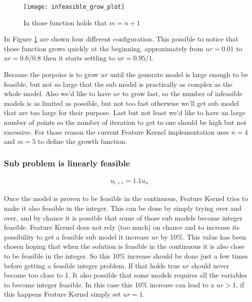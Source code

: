    \begin{figure}[H]
        \centering
        \texttt{[image: infeasible\_grow\_plot]}
        \caption{In those function holds that $m = n+1$}\label{fig:inf-grow-plot}
    \end{figure}
    
    In Figure \ref{fig:inf-grow-plot} are shown four different configuration. This possible to notice that those function
    grows quickly at the beginning, approximately from $ur = 0.01$ to $ur = 0.6 / 0.8$ then it starts settling
    to $ur = 0.95 / 1$.

    Because the porpoise is to grow $ur$ until the generate model is large enough to be feasible, but not so large 
    that the sub model is practically as complex as the whole model. Also we'd like to have $ur$ to grow fast, so the number
    of infeasible models is as limited as possible, but not too fast otherwise we'll get sub model that are too large for their
    purpose. Last but not least we'd like to have an large number of points so the number of iteration to get to one should be high 
    but not excessive.
    For those reason the current Feature Kernel implementation uses $n = 4$ and $m = 5$ to define the growth function.



\subsubsection*{Sub problem is linearly feasible}
    \begin{align}
        &u_{i+i} = 1.1 u_{n} \label{eq:ur-lin-fease-grow}
    \end{align}

    Once the model is proven to be feasible in the continuous, Feature Kernel tries to make it also feasible in the 
    integer. This can be done by simply trying over and over, and by chance it is possible that some of those sub models
    become integer feasible. Feature Kernel does not rely (too much) on chance and to increase its possibility to get 
    a feasible sub model it increase $ur$ by 10\%. This value has been chosen hoping that when the solution is feasible 
    in the continuous it is also close to be feasible in the integer. So this 10\% increase should be done just a few times
    before getting a feasible integer problem. If that holds true $ur$ should never become too close to 1.  
    It also possible that some models requires all the variables to become integer feasible. In this case this 10\% increase 
    can lead to a $ur > 1$, if this happens Feature Kernel simply set $ur = 1$.

